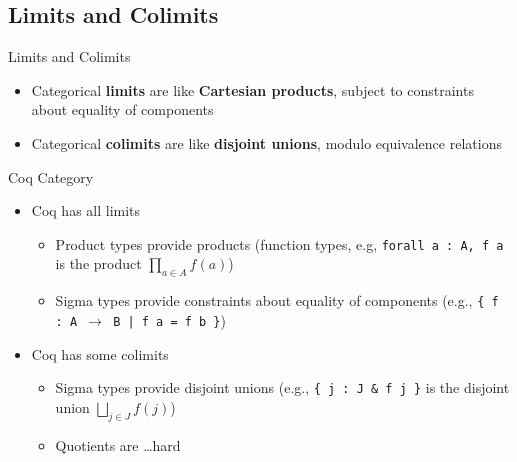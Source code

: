 \documentclass[utf8x]{beamer}
\begin{document}
  \subsection{Limits and Colimits}
    \begin{frame}{Limits and Colimits}
      \begin{itemize}
        \item
          Categorical \textbf{limits} are like \textbf{Cartesian products}, subject to constraints about equality of components \pause
        \item
          Categorical \textbf{colimits} are like \textbf{disjoint unions}, modulo equivalence relations
      \end{itemize}
    \end{frame}

    \begin{frame}{Coq Category}
      \begin{itemize}
        \item Coq has all limits
          \begin{itemize}
            \item
              Product types provide products (function types, e.g, \texttt{forall~a~:~A,~f~a} is the product $\prod_{a \in A} f(a)$)
            \item
              Sigma types provide constraints about equality of components (e.g., \texttt{\{ f : A $\to$ B | f a = f b \}})
          \end{itemize} \pause
        \item Coq has some colimits
          \begin{itemize}
            \item
              Sigma types provide disjoint unions (e.g., \texttt{\{ j : J \& f j \}} is the disjoint union $\bigsqcup_{j \in J} f(j)$)
            \item
              Quotients are \ldots\space hard
          \end{itemize}
      \end{itemize}
    \end{frame}
\end{document}
